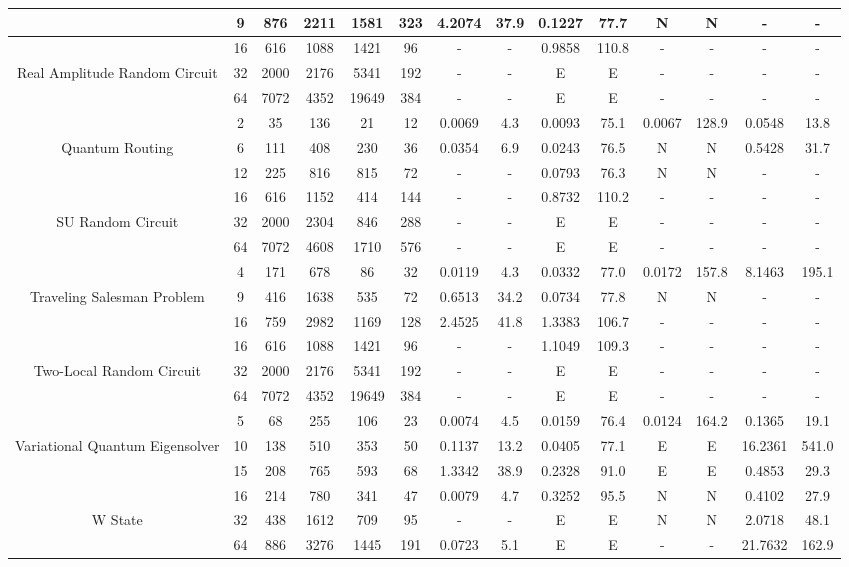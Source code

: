 \begin{table}[htb]
{\begin{tabular}{|c|c|c|c|c|c|c|c|c|c|c|c|c|c|}
 & 
9 & 876 & 2211 & 1581 & 323
 & 4.2074 & 37.9
 & 0.1227 & 77.7
 & N & N 
 & - & -
 \\
\hline
 & 
16 & 616 & 1088 & 1421 & 96
 & - & -
 & 0.9858 & 110.8
 & - & -
 & - & -
 \\
Real Amplitude Random Circuit & 
32 & 2000 & 2176 & 5341 & 192
 & - & -
 & E & E
 & - & -
 & - & -
 \\
 & 
64 & 7072 & 4352 & 19649 & 384
 & - & -
 & E & E
 & - & -
 & - & -
 \\
\hline
 & 
2 & 35 & 136 & 21 & 12
 & 0.0069 & 4.3
 & 0.0093 & 75.1
 & 0.0067 & 128.9
 & 0.0548 & 13.8
 \\
Quantum Routing & 
6 & 111 & 408 & 230 & 36
 & 0.0354 & 6.9
 & 0.0243 & 76.5
 & N & N 
 & 0.5428 & 31.7
 \\
 & 
12 & 225 & 816 & 815 & 72
 & - & -
 & 0.0793 & 76.3
 & N & N 
 & - & -
 \\
\hline
 & 
16 & 616 & 1152 & 414 & 144
 & - & -
 & 0.8732 & 110.2
 & - & -
 & - & -
 \\
SU Random Circuit & 
32 & 2000 & 2304 & 846 & 288
 & - & -
 & E & E
 & - & -
 & - & -
 \\
 & 
64 & 7072 & 4608 & 1710 & 576
 & - & -
 & E & E
 & - & -
 & - & -
 \\
\hline
 & 
4 & 171 & 678 & 86 & 32
 & 0.0119 & 4.3
 & 0.0332 & 77.0
 & 0.0172 & 157.8
 & 8.1463 & 195.1
 \\
Traveling Salesman Problem & 
9 & 416 & 1638 & 535 & 72
 & 0.6513 & 34.2
 & 0.0734 & 77.8
 & N & N 
 & - & -
 \\
 & 
16 & 759 & 2982 & 1169 & 128
 & 2.4525 & 41.8
 & 1.3383 & 106.7
 & - & -
 & - & -
 \\
\hline
 & 
16 & 616 & 1088 & 1421 & 96
 & - & -
 & 1.1049 & 109.3
 & - & -
 & - & -
 \\
Two-Local Random Circuit & 
32 & 2000 & 2176 & 5341 & 192
 & - & -
 & E & E
 & - & -
 & - & -
 \\
 & 
64 & 7072 & 4352 & 19649 & 384
 & - & -
 & E & E
 & - & -
 & - & -
 \\
\hline
 & 
5 & 68 & 255 & 106 & 23
 & 0.0074 & 4.5
 & 0.0159 & 76.4
 & 0.0124 & 164.2
 & 0.1365 & 19.1
 \\
Variational Quantum Eigensolver & 
10 & 138 & 510 & 353 & 50
 & 0.1137 & 13.2
 & 0.0405 & 77.1
 & E & E
 & 16.2361 & 541.0
 \\
 & 
15 & 208 & 765 & 593 & 68
 & 1.3342 & 38.9
 & 0.2328 & 91.0
 & E & E
 & 0.4853 & 29.3
 \\
\hline
 & 
16 & 214 & 780 & 341 & 47
 & 0.0079 & 4.7
 & 0.3252 & 95.5
 & N & N 
 & 0.4102 & 27.9
 \\
W State & 
32 & 438 & 1612 & 709 & 95
 & - & -
 & E & E
 & N & N 
 & 2.0718 & 48.1
 \\
 & 
64 & 886 & 3276 & 1445 & 191
 & 0.0723 & 5.1
 & E & E
 & - & -
 & 21.7632 & 162.9
 \\
\hline
\end{tabular}}
\end{table}